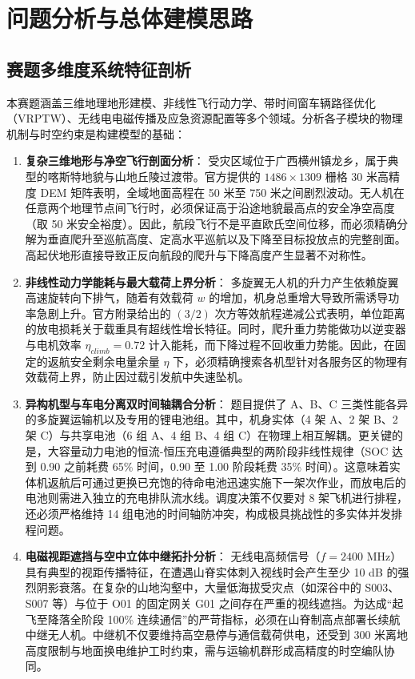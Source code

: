 \section{问题分析与总体建模思路}

\subsection{赛题多维度系统特征剖析}

本赛题涵盖三维地理地形建模、非线性飞行动力学、带时间窗车辆路径优化（VRPTW）、无线电电磁传播及应急资源配置等多个领域。分析各子模块的物理机制与时空约束是构建模型的基础：

\begin{enumerate}
    \item \textbf{复杂三维地形与净空飞行剖面分析}：
    受灾区域位于广西横州镇龙乡，属于典型的喀斯特地貌与山地丘陵过渡带。官方提供的 $1486 \times 1309$ 栅格 30 米高精度 DEM 矩阵表明，全域地面高程在 50 米至 750 米之间剧烈波动。无人机在任意两个地理节点间飞行时，必须保证高于沿途地貌最高点的安全净空高度（取 50 米安全裕度）。因此，航段飞行不是平直欧氏空间位移，而必须精确分解为垂直爬升至巡航高度、定高水平巡航以及下降至目标投放点的完整剖面\cite{zhang2021uav}。高起伏地形直接导致正反向航段的爬升与下降高度产生显著不对称性。
    
    \item \textbf{非线性动力学能耗与最大载荷上界分析}：
    多旋翼无人机的升力产生依赖旋翼高速旋转向下排气，随着有效载荷 $w$ 的增加，机身总重增大导致所需诱导功率急剧上升。官方附录给出的 $(3/2)$ 次方等效航程递减公式表明，单位距离的放电损耗关于载重具有超线性增长特征。同时，爬升重力势能做功以逆变器与电机效率 $\eta_{climb} = 0.72$ 计入能耗，而下降过程不回收重力势能。因此，在固定的返航安全剩余电量余量 $\eta$ 下，必须精确搜索各机型针对各服务区的物理有效载荷上界，防止因过载引发航中失速坠机。
    
    \item \textbf{异构机型与车电分离双时间轴耦合分析}：
    题目提供了 A、B、C 三类性能各异的多旋翼运输机以及专用的锂电池组。其中，机身实体（4 架 A、2 架 B、2 架 C）与共享电池（6 组 A、4 组 B、4 组 C）在物理上相互解耦。更关键的是，大容量动力电池的恒流-恒压充电遵循典型的两阶段非线性规律（SOC 达到 0.90 之前耗费 65\% 时间，0.90 至 1.00 阶段耗费 35\% 时间）。这意味着实体机返航后可通过更换已充饱的待命电池迅速实施下一架次作业，而放电后的电池则需进入独立的充电排队流水线。调度决策不仅要对 8 架飞机进行排程，还必须严格维持 14 组电池的时间轴防冲突，构成极具挑战性的多实体并发排程问题。
    
    \item \textbf{电磁视距遮挡与空中立体中继拓扑分析}：
    无线电高频信号（$f=2400\text{ MHz}$）具有典型的视距传播特征，在遭遇山脊实体刺入视线时会产生至少 10 dB 的强烈阴影衰落。在复杂的山地沟壑中，大量低海拔受灾点（如深谷中的 S003、S007 等）与位于 O01 的固定网关 G01 之间存在严重的视线遮挡。为达成“起飞至降落全阶段 100\% 连续通信”的严苛指标，必须在山脊制高点部署长续航中继无人机。中继机不仅要维持高空悬停与通信载荷供电，还受到 300 米离地高度限制与地面换电维护工时约束，需与运输机群形成高精度的时空编队协同。
    

\end{enumerate}
